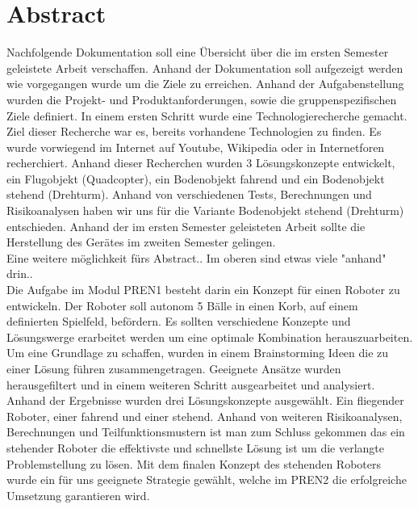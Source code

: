 \section{Abstract}
Nachfolgende Dokumentation soll eine Übersicht über die im ersten Semester geleistete Arbeit verschaffen. Anhand der Dokumentation soll aufgezeigt werden wie vorgegangen wurde um die Ziele zu erreichen. Anhand der Aufgabenstellung wurden die Projekt- und Produktanforderungen, sowie die gruppenspezifischen Ziele definiert. In einem ersten Schritt wurde eine Technologierecherche gemacht. Ziel dieser Recherche war es, bereits vorhandene Technologien zu finden. Es wurde vorwiegend im Internet auf Youtube, Wikipedia oder in Internetforen recherchiert. Anhand dieser Recherchen wurden 3 Lösungskonzepte entwickelt, ein Flugobjekt (Quadcopter), ein Bodenobjekt fahrend und ein Bodenobjekt stehend (Drehturm). Anhand von verschiedenen Tests, Berechnungen und Risikoanalysen haben wir uns für die Variante Bodenobjekt stehend (Drehturm) entschieden. Anhand der im ersten Semester geleisteten Arbeit sollte die Herstellung des Gerätes im zweiten Semester gelingen.\\
Eine weitere möglichkeit fürs Abstract.. Im oberen sind etwas viele "{}anhand{}" drin..\\
Die Aufgabe im Modul PREN1 besteht darin ein Konzept für einen Roboter zu entwickeln. Der Roboter soll autonom 5 Bälle in einen Korb, auf einem definierten Spielfeld, befördern. Es sollten verschiedene Konzepte und Lösungswerge erarbeitet werden um eine optimale Kombination herauszuarbeiten. Um eine Grundlage zu schaffen, wurden in einem Brainstorming Ideen die zu einer Lösung führen zusammengetragen. Geeignete Ansätze wurden herausgefiltert und in einem weiteren Schritt ausgearbeitet und analysiert. Anhand der Ergebnisse wurden drei Lösungskonzepte ausgewählt. Ein fliegender Roboter, einer fahrend und einer stehend. Anhand von weiteren Risikoanalysen, Berechnungen und Teilfunktionsmustern ist man zum Schluss gekommen das ein stehender Roboter die effektivste und schnellste Lösung ist um die verlangte Problemstellung zu lösen. Mit dem finalen Konzept des stehenden Roboters wurde ein für uns geeignete Strategie gewählt, welche im PREN2 die erfolgreiche Umsetzung garantieren wird.